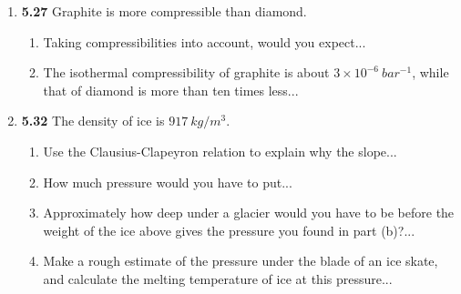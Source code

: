 \documentclass[fleqn]{article}
\begin{document}
\begin{enumerate}
\begin{enumerate}

    \end{enumerate}


    \item \textbf{5.27} Graphite is more compressible than diamond.
    \begin{enumerate}
      \item Taking compressibilities into account, would you expect...


      \item The isothermal compressibility of graphite is about $3 \times 10^{-6} ~ bar^{-1}$, 
      while that of diamond is more than ten times less...


    \end{enumerate}


    \item \textbf{5.32} The density of ice is $917 ~ kg/m^3$.
    \begin{enumerate}
      \item Use the Clausius-Clapeyron relation to explain why the slope...


      \item How much pressure would you have to put...


      \item Approximately how deep under a glacier would you have to be before the 
      weight of the ice above gives the pressure you found in part (b)?...


      \item Make a rough estimate of the pressure under the blade of an ice skate, and 
      calculate the melting temperature of ice at this pressure...


    \end{enumerate}


  \end{enumerate}
\end{document}
